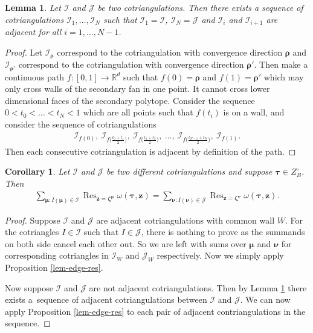 \documentclass[pdftex]{sigma}
\DeclareMathOperator*{\Res}{Res}
\numberwithin{equation}{section}
\newtheorem{Corollary}[Theorem]{Corollary}
\newtheorem{Lemma}[Theorem]{Lemma}
\begin{document}
\begin{Lemma}\label{lem-adj-conn}
Let $\mathcal{I}$ and $\mathcal{J}$ be two cotriangulations. Then there exists a sequence of cotriangulations $\mathcal{I}_1,\dots,\mathcal{I}_N$ such that $\mathcal{I}_1 = \mathcal{I}$, $\mathcal{I}_N = \mathcal{J}$ and $\mathcal{I}_{i}$ and $\mathcal{I}_{i+1}$ are adjacent for all $i=1,\dots,N-1$.
\end{Lemma}

\begin{proof}
Let $\mathcal{I}_{\bm\rho}$ correspond to the cotriangulation with convergence direction $\bm\rho$ and $\mathcal{I}_{\bm\rho'}$ correspond to the cotriangulation with convergence direction $\bm\rho'$. Then make a continuous path $f\colon [0,1] \rightarrow \mathbb{R}^d$ such that $f(0) = \bm\rho$ and $f(1) = \bm\rho'$ which may only cross walls of the secondary fan in one point. It cannot cross lower dimensional faces of the secondary polytope. Consider the sequence $0 < t_0 < \dots < t_N < 1$ which are all points such that $f(t_i)$ is on a wall, and consider the sequence of cotriangulations
\begin{gather*}
\mathcal{I}_{f(0)},\ \mathcal{I}_{f\big(\frac{t_{0} + t_{1}}{2}\big)},\
\mathcal{I}_{f\big(\frac{t_{1} + t_{2}}{2}\big)},\ \dots,\
\mathcal{I}_{f\big(\frac{t_{N-1} + t_{N}}{2}\big)},\ \mathcal{I}_{f(1)}.
\end{gather*}
Then each consecutive cotriangulation is adjacent by definition of the path.
\end{proof}

\begin{Corollary}\label{cor-gen-tri}
Let $\mathcal{I}$ and $\mathcal{J}$ be two different cotriangulations
and suppose $\bm\tau\in Z_B^\circ$.
Then
\begin{gather*}
\sum_{\bm{\mu}\colon I(\bm{\mu})\in\mathcal{I}}\Res_{\bm{z}=\bm\zeta^{\bm\mu}}\omega(\bm{\tau},\bm{z})
=\sum_{\bm{\nu}\colon I(\bm{\nu})\in\mathcal{J}}\Res_{\bm{z}=\bm\zeta^{\bm\nu}}\omega(\bm{\tau},\bm{z}).
\end{gather*}
\end{Corollary}

\begin{proof}
Suppose $\mathcal{I}$ and $\mathcal{J}$ are adjacent cotriangulations with common wall $W$.
For the cotriangles $I \in \mathcal{I}$ such that $I \in \mathcal{J}$, there is nothing to prove as the summands on both side cancel each other out. So we are left with sums over $\bm{\mu}$ and $\bm\nu$ for corresponding cotriangles in $\mathcal{I}_W$ and $\mathcal{J}_W$ respectively. Now we simply apply Proposition \ref{lem-edge-res}.

Now suppose $\mathcal{I}$ and $\mathcal{J}$ are not adjacent cotriangulations. Then by Lemma \ref{lem-adj-conn} there exists a~sequence of adjacent cotriangulations between $\mathcal{I}$ and $\mathcal{J}$. We can now apply Proposition \ref{lem-edge-res} to each pair of adjacent contriangulations in the sequence.
\end{proof}
\end{document}
